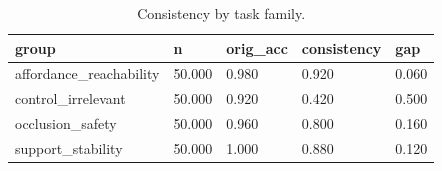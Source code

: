 \begin{table}[t]
\centering
\begin{tabular}{lllll}
\toprule
group & n & orig_acc & consistency & gap \\
\midrule
affordance_reachability & 50.000 & 0.980 & 0.920 & 0.060 \\
control_irrelevant & 50.000 & 0.920 & 0.420 & 0.500 \\
occlusion_safety & 50.000 & 0.960 & 0.800 & 0.160 \\
support_stability & 50.000 & 1.000 & 0.880 & 0.120 \\
\bottomrule
\end{tabular}
\caption{Consistency by task family.}
\end{table}
